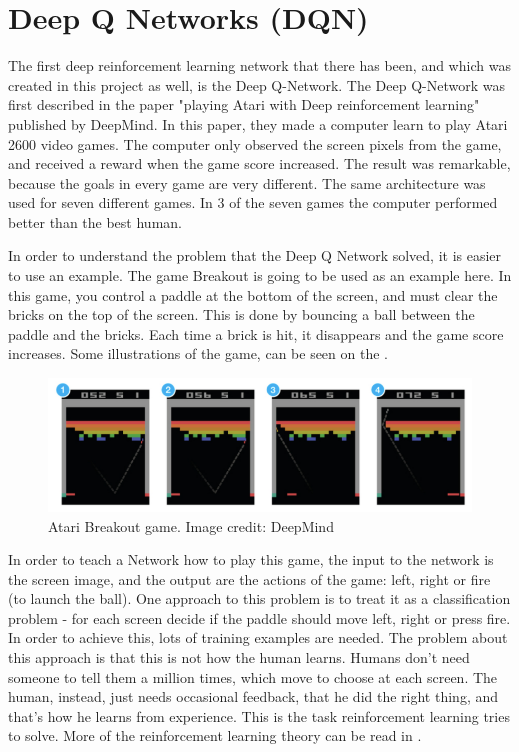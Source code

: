 \section{Deep Q Networks (DQN)}
\label{sec:DQN}
The first deep reinforcement learning network that there has been, and which was created in this project as well, is the Deep Q-Network. The Deep Q-Network was first described in the paper "playing Atari with Deep reinforcement learning" \cite{DBLP:journals/corr/MnihKSGAWR13} published by DeepMind. In this paper, they made a computer learn to play Atari 2600 video games. The computer only observed the screen pixels from the game, and received a reward when the game score increased. The result was remarkable, because the goals in every game are very different. The same architecture was used for seven different games. In 3 of the seven games the computer performed better than the best human.

In order to understand the problem that the Deep Q Network solved, it is easier to use an example. The game Breakout is going to be used as an example here. In this game, you control a paddle at the bottom of the screen, and must clear the bricks on the top of the screen. This is done by bouncing a ball between the paddle and the bricks. Each time a brick is hit, it disappears and the game score increases. Some illustrations of the game, can be seen on the .

\begin{figure}[H]
	\centering
	\includegraphics[width=1\textwidth]{Figures/Architecture/DQN/Atari_breakout.png}
	\caption{Atari Breakout game. Image credit: DeepMind\cite{DBLP:journals/corr/MnihKSGAWR13} }
	\label{fig:Atari_breakout}
\end{figure}

In order to teach a Network how to play this game, the input to the network is the screen image, and the output are the actions of the game: left, right or fire (to launch the ball). One approach to this problem is to treat it as a classification problem - for each screen decide if the paddle should move left, right or press fire. In order to achieve this, lots of training examples are needed. The problem about this approach is that this is not how the human learns. Humans don't need someone to tell them a million times, which move to choose at each screen. The human, instead, just needs occasional feedback, that he did the right thing, and that's how he learns from experience. This is the task reinforcement learning tries to solve. More of the reinforcement learning theory can be read in . 

